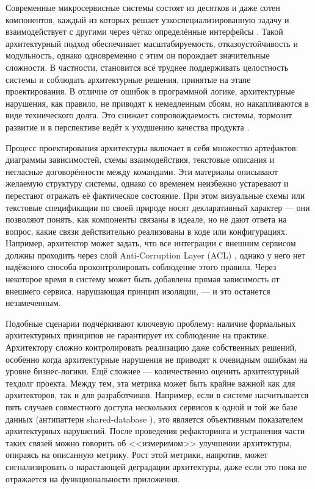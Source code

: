 
Современные микросервисные системы состоят из десятков и даже сотен компонентов, каждый из которых решает узкоспециализированную задачу и взаимодействует с другими через чётко определённые интерфейсы \cite{msa-overview}. Такой архитектурный подход обеспечивает масштабируемость, отказоустойчивость и модульность, однако одновременно с этим он порождает значительные сложности. В частности, становится всё труднее поддерживать целостность системы и соблюдать архитектурные решения, принятые на этапе проектирования. В отличие от ошибок в программной логике, архитектурные нарушения, как правило, не приводят к немедленным сбоям, но накапливаются в виде технического долга. Это снижает сопровождаемость системы, тормозит развитие и в перспективе ведёт к ухудшению качества продукта \cite{arch-debt}.

Процесс проектирования архитектуры включает в себя множество артефактов: диаграммы зависимостей, схемы взаимодействия, текстовые описания и негласные договорённости между командами. Эти материалы описывают желаемую структуру системы, однако со временем неизбежно устаревают и перестают отражать её фактическое состояние. При этом визуальные схемы или текстовые спецификации по своей природе носят декларативный характер — они позволяют понять, как компоненты связаны в идеале, но не дают ответа на вопрос, какие связи действительно реализованы в коде или конфигурациях. Например, архитектор может задать, что все интеграции с внешним сервисом должны проходить через слой Anti-Corruption Layer (ACL) \cite{acl-pattern}, однако у него нет надёжного способа проконтролировать соблюдение этого правила. Через некоторое время в систему может быть добавлена прямая зависимость от внешнего сервиса, нарушающая принцип изоляции, — и это останется незамеченным.

Подобные сценарии подчёркивают ключевую проблему: наличие формальных архитектурных принципов не гарантирует их соблюдение на практике. Архитектору сложно контролировать реализацию даже собственных решений, особенно когда архитектурные нарушения не приводят к очевидным ошибкам на уровне бизнес-логики. Ещё сложнее — количественно оценить архитектурный техдолг проекта. Между тем, эта метрика может быть крайне важной как для архитекторов, так и для разработчиков. Например, если в системе насчитывается пять случаев совместного доступа нескольких сервисов к одной и той же базе данных (антипаттерн shared-database \cite{antipatterns-taxonomy}), это является объективным показателем архитектурных нарушений. После проведения рефакторинга и устранения части таких связей можно говорить об <<измеримом>> улучшении архитектуры, опираясь на описанную метрику. Рост этой метрики, напротив, может сигнализировать о нарастающей деградации архитектуры, даже если это пока не отражается на функциональности приложения.

